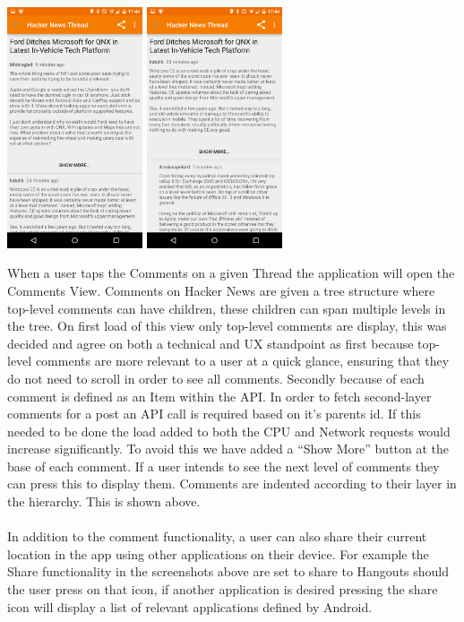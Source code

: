 \documentclass[11pt]{article}
\begin{document}
\begin{center}
\includegraphics[width=0.3\textwidth]{comments.png}
\includegraphics[width=0.3\textwidth]{commentsExpanded.png}
\end{center}

When a user taps the Comments on a given Thread the application will open the Comments View. Comments on Hacker News are given a tree structure where top-level comments can have children, these children can span multiple levels in the tree. On first load of this view only top-level comments are display, this was decided and agree on both a technical and UX standpoint as first because top-level comments are more relevant to a user at a quick glance, ensuring that they do not need to scroll in order to see all comments. Secondly because of each comment is defined as an Item within the API. In order to fetch second-layer comments for a post an API call is required based on it’s parents id. If this needed to be done the load added to both the CPU and Network requests would increase significantly. To avoid this we have added a “Show More” button at the base of each comment. If a user intends to see the next level of comments they can press this to display them. Comments are indented according to their layer in the hierarchy. This is shown above.
\\
\\
In addition to the comment functionality, a user can also share their current location in the app using other applications on their device. For example the Share functionality in the screenshots above are set to share to Hangouts should the user press on that icon, if another application is desired pressing the share icon will display a list of relevant applications defined by Android. 
\end{document}
